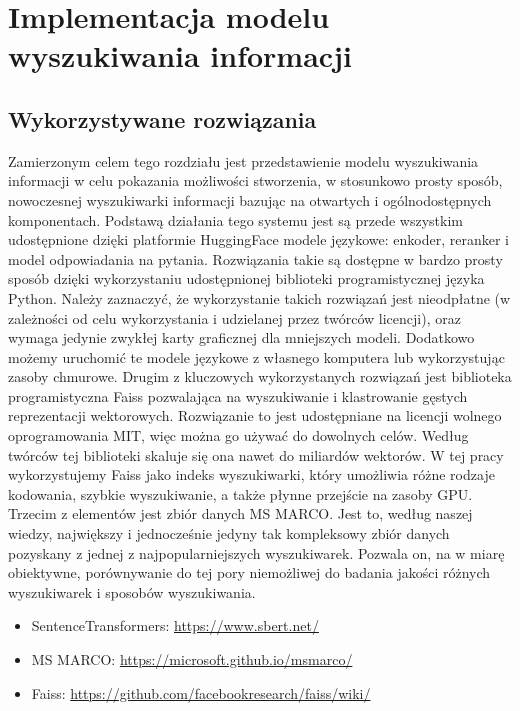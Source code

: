 \chapter{Implementacja modelu wyszukiwania informacji}
\label{chap:czwarty}

\section{Wykorzystywane rozwiązania}

Zamierzonym celem tego rozdziału jest przedstawienie modelu wyszukiwania informacji w celu pokazania możliwości stworzenia, w stosunkowo prosty sposób, nowoczesnej wyszukiwarki informacji bazując na otwartych i ogólnodostępnych komponentach. Podstawą działania tego systemu jest są przede wszystkim udostępnione dzięki platformie HuggingFace modele językowe: enkoder, reranker i model odpowiadania na pytania. Rozwiązania takie są dostępne w bardzo prosty sposób dzięki wykorzystaniu udostępnionej biblioteki programistycznej języka Python. Należy zaznaczyć, że wykorzystanie takich rozwiązań jest nieodpłatne (w zależności od celu wykorzystania i udzielanej przez twórców licencji), oraz wymaga jedynie zwykłej karty graficznej dla mniejszych modeli. Dodatkowo możemy uruchomić te modele językowe z własnego komputera lub wykorzystując zasoby chmurowe. Drugim z kluczowych wykorzystanych rozwiązań jest biblioteka programistyczna Faiss pozwalająca na wyszukiwanie i klastrowanie gęstych reprezentacji wektorowych. Rozwiązanie to jest udostępniane na licencji wolnego oprogramowania MIT, więc można go używać do dowolnych celów. Według twórców tej biblioteki skaluje się ona nawet do miliardów wektorów. W tej pracy wykorzystujemy Faiss jako indeks wyszukiwarki, który umożliwia różne rodzaje kodowania, szybkie wyszukiwanie, a także płynne przejście na zasoby GPU. Trzecim z elementów jest zbiór danych MS MARCO. Jest to, według naszej wiedzy, największy i jednocześnie jedyny tak kompleksowy zbiór danych pozyskany z jednej z najpopularniejszych wyszukiwarek. Pozwala on, na w miarę obiektywne, porównywanie do tej pory niemożliwej do badania jakości różnych wyszukiwarek i sposobów wyszukiwania.\newline

\begin{itemize}
\item SentenceTransformers: \url{https://www.sbert.net/}\newline
\item MS MARCO: \url{https://microsoft.github.io/msmarco/}\newline
\item Faiss: \url{https://github.com/facebookresearch/faiss/wiki/}\newline
\end{itemize}


